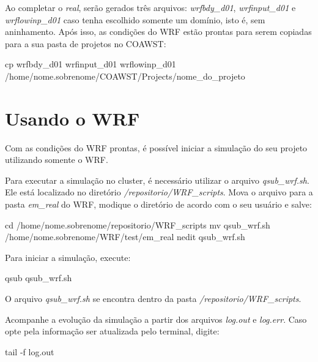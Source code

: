\noindent Ao completar o \textit{real}, serão gerados três arquivos: \textit{wrfbdy\_d01}, \textit{wrfinput\_d01} e \textit{wrflowinp\_d01} caso tenha escolhido somente um domínio, isto é, sem aninhamento. Após isso, as condições do WRF estão prontas para serem copiadas para a sua pasta de projetos no COAWST:
\bigskip

\begin{bashcode}[fontsize=\scriptsize]
cp wrfbdy_d01 wrfinput_d01 wrflowinp_d01 /home/nome.sobrenome/COAWST/Projects/nome_do_projeto
\end{bashcode}
\bigskip

\section{Usando o WRF}\label{wrfsecao2}
\bigskip

\noindent Com as condições do WRF prontas, é possível iniciar a simulação do seu projeto utilizando somente o WRF.
\bigskip

\noindent Para executar a simulação no cluster, é necessário utilizar o arquivo \textit{qsub\_wrf.sh}. Ele está localizado no diretório \textit{/repositorio/WRF\_scripts}. Mova o arquivo para a pasta \textit{em\_real} do WRF, modique o diretório de acordo com o seu usuário e salve:
\bigskip

\begin{bashcode}
cd /home/nome.sobrenome/repositorio/WRF_scripts
mv qsub_wrf.sh /home/nome.sobrenome/WRF/test/em_real
nedit qsub_wrf.sh
\end{bashcode}
\bigskip

\noindent Para iniciar a simulação, execute:
\bigskip

\begin{bashcode}
qsub qsub_wrf.sh
\end{bashcode}
\bigskip

\begin{tcolorbox}[enhanced,
  grow to left by=0cm,%
  grow to right by=0cm,%
  enlarge top by=0cm,%
  enlarge bottom by=0cm,%
  tcbox raise base,
  boxrule=1.0pt,
  left=18mm,
  colframe=red!50!black,coltext=red!25!black,colback=red!10!white,
  overlay={\begin{tcbclipinterior}\fill[red!75!blue!50!white] (frame.south west)
    rectangle node[text=white,font=\sffamily\bfseries\footnotesize,rotate=0] {ATENÇÃO} ([xshift=18mm]frame.north west);\end{tcbclipinterior}}]
O arquivo \textit{qsub\_wrf.sh} se encontra dentro da pasta \textit{/repositorio/WRF\_scripts}.
\end{tcolorbox}
\bigskip

\noindent Acompanhe a evolução da simulação a partir dos arquivos \textit{log.out} e \textit{log.err}. Caso opte pela informação ser atualizada pelo terminal, digite:
\bigskip

\begin{bashcode}
tail -f log.out
\end{bashcode}
\bigskip
